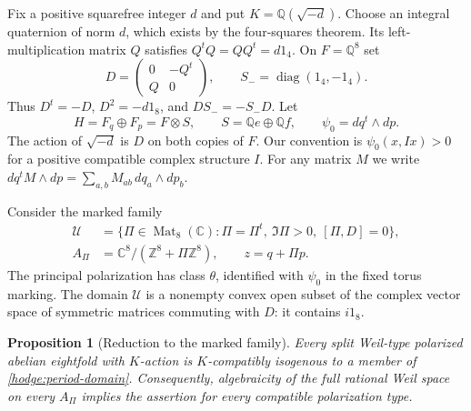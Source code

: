 \documentclass[11pt]{article}
\newtheorem{proposition}[theorem]{Proposition}
\theoremstyle{definition}
\theoremstyle{remark}
\newcommand{\Q}{\mathbb Q}
\newcommand{\C}{\mathbb C}
\newcommand{\Z}{\mathbb Z}
\DeclareMathOperator{\diag}{diag}
\numberwithin{equation}{section}
\begin{document}
Fix a positive squarefree integer $d$ and put $K=\Q(\sqrt{-d})$.
Choose an integral quaternion of norm $d$, which exists by the four-squares
theorem.  Its left-multiplication matrix $Q$ satisfies
$Q^tQ=QQ^t=d1_4$.  On $F=\Q^8$ set
\begin{equation}
 D=\begin{pmatrix}0&-Q^t\\Q&0\end{pmatrix},
 \qquad S_-=\diag(1_4,-1_4).
 \label{hodge:matrices}
\end{equation}
Thus $D^t=-D$, $D^2=-d1_8$, and $DS_-=-S_-D$.
Let
\[
 H=F_q\oplus F_p=F\otimes S,
 \qquad S=\Q e\oplus\Q f,
 \qquad \psi_0=dq^t\wedge dp.
\]
The action of $\sqrt{-d}$ is $D$ on both copies of $F$.  Our convention is
$\psi_0(x,Ix)>0$ for a positive compatible complex structure $I$.
For any matrix $M$ we write
$dq^tM\wedge dp=\sum_{a,b}M_{ab}\,dq_a\wedge dp_b$.

Consider the marked family
\begin{equation}
 \begin{split}
 \mathcal U&=\{\Pi\in\operatorname{Mat}_8(\C):
       \Pi=\Pi^t,\ \Im\Pi>0,\ [\Pi,D]=0\},\\
 A_\Pi&=\C^8/(\Z^8+\Pi\Z^8),\qquad z=q+\Pi p.
 \end{split}
 \label{hodge:period-domain}
\end{equation}
The principal polarization has class $\theta$, identified with $\psi_0$
in the fixed torus marking.  The domain $\mathcal U$ is a nonempty convex
open subset of the complex vector space of symmetric matrices commuting
with $D$: it contains $i1_8$.

\begin{proposition}[Reduction to the marked family]
\label{hodge:isogeny-reduction}
Every split Weil-type polarized abelian eightfold with $K$-action is
$K$-compatibly isogenous to a member of \eqref{hodge:period-domain}.
Consequently, algebraicity of the full rational Weil space on every
$A_\Pi$ implies the assertion for every compatible polarization type.
\end{proposition}
\end{document}
